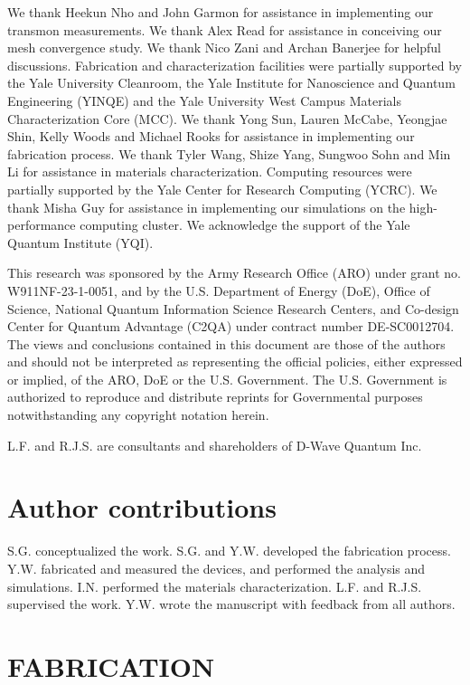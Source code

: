 \documentclass[
    reprint,
    superscriptaddress,
    amsmath,amssymb,
    aps,
    prb,
    floatfix,
]{revtex4-2}
\begin{document}
\begin{acknowledgments}
We thank Heekun Nho and John Garmon for assistance in implementing our transmon measurements. We thank Alex Read for assistance in conceiving our mesh convergence study. We thank Nico Zani and Archan Banerjee for helpful discussions. Fabrication and characterization facilities were partially supported by the Yale University Cleanroom, the Yale Institute for Nanoscience and Quantum Engineering (YINQE) and the Yale University West Campus Materials Characterization Core (MCC). We thank Yong Sun, Lauren McCabe, Yeongjae Shin, Kelly Woods and Michael Rooks for assistance in implementing our fabrication process. We thank Tyler Wang, Shize Yang, Sungwoo Sohn and Min Li for assistance in materials characterization. Computing resources were partially supported by the Yale Center for Research Computing (YCRC). We thank Misha Guy for assistance in implementing our simulations on the high-performance computing cluster. We acknowledge the support of the Yale Quantum Institute (YQI).

This research was sponsored by the Army Research Office (ARO) under grant no. W911NF-23-1-0051, and by the U.S. Department of Energy (DoE), Office of Science, National Quantum Information Science Research Centers, and Co-design Center for Quantum Advantage (C2QA) under contract number DE-SC0012704. The views and conclusions contained in this document are those of the authors and should not be interpreted as representing the official policies, either expressed or implied, of the ARO, DoE or the U.S. Government. The U.S. Government is authorized to reproduce and distribute reprints for Governmental purposes notwithstanding any copyright notation herein.

L.F. and R.J.S. are consultants and shareholders of D-Wave Quantum Inc.
\end{acknowledgments}

\section*{Author contributions}

S.G. conceptualized the work. S.G. and Y.W. developed the fabrication process. Y.W. fabricated and measured the devices, and performed the analysis and simulations. I.N. performed the materials characterization. L.F. and R.J.S. supervised the work. Y.W. wrote the manuscript with feedback from all authors.

\appendix

\section{FABRICATION}\label{appendix:fabrication}
\end{document}
